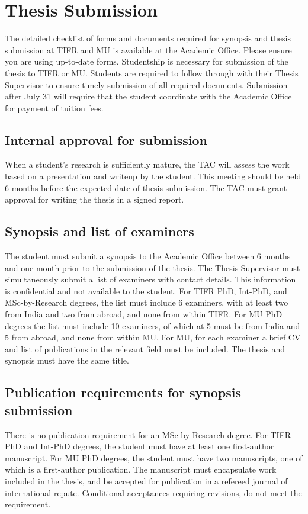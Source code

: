 \documentclass[a4paper]{extarticle}
\begin{document}
\section{Thesis Submission}
The detailed checklist of forms and documents required for synopsis and thesis submission
at TIFR and MU is available at the Academic Office. Please ensure you are using up-to-date
forms. Studentship is necessary for submission of the thesis to TIFR or MU. Students are
required to follow through with their Thesis Supervisor to ensure timely submission of all
required documents. Submission after July 31 will require that the student coordinate with
the Academic Office for payment of tuition fees.

\subsection{Internal approval for submission} 
When a student’s research is
sufficiently mature, the TAC will assess the work based on a presentation and
writeup by the student. This meeting should be held 6 months before the expected
date of thesis submission. The TAC must grant approval for writing the thesis in
a signed report.

\subsection{Synopsis and list of examiners} 
The student must submit a synopsis to the Academic
Office between 6 months and one month prior to the submission of the thesis. The Thesis
Supervisor must simultaneously submit a list of examiners with contact details. This
information is confidential and not available to the student. For TIFR PhD, Int-PhD, and
MSc-by-Research degrees, the list must include 6 examiners, with at least two from India
and two from abroad, and none from within TIFR. For MU PhD degrees the list must
include 10 examiners, of which at 5 must be from India and 5 from abroad, and none from
within MU. For MU, for each examiner a brief CV and list of publications in the relevant
field must be included. The thesis and synopsis must have the same title.

\subsection{Publication requirements for synopsis submission}
There is no publication requirement
for an MSc-by-Research degree. For TIFR PhD and Int-PhD degrees, the student must have
at least one first-author manuscript. For MU PhD degrees, the student must have two
manuscripts, one of which is a first-author publication. The manuscript must encapsulate
work included in the thesis, and be accepted for publication in a refereed journal of
international repute. Conditional acceptances requiring revisions, do not meet the
requirement.
\end{document}
